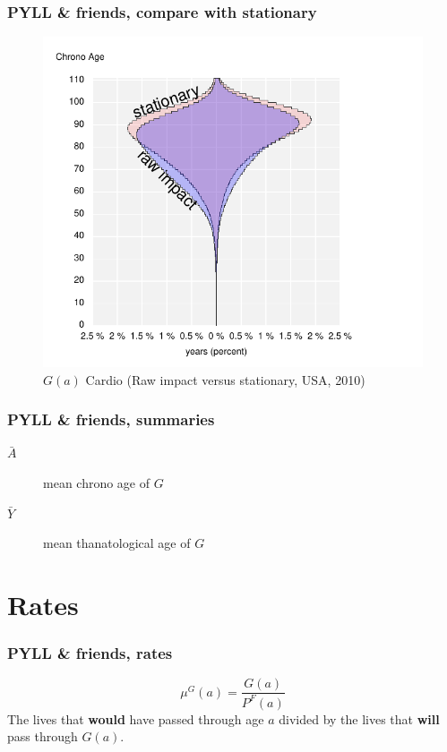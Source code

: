 \documentclass{beamer}
\begin{document}
\begin{frame}
\frametitle{PYLL \& friends, compare with stationary}
\vspace{-1cm}
\begin{figure}[b]
    \centering
    \includegraphics[scale=.7]{Figures/f13_AgesWonstationary.pdf}
    \caption{$G(a)$ Cardio (Raw impact versus stationary, USA, 2010)}
\end{figure} 
\end{frame}

\begin{frame}
\frametitle{PYLL \& friends, summaries}
\begin{description}
\item[$\bar{A}$] mean chrono age of $G$
\item[$\bar{Y}$] mean thanatological age of $G$
\end{description}
\end{frame}

\section{Rates}
\begin{frame}
\frametitle{PYLL \& friends, rates}
\begin{equation}
\mu^G(a) = \frac{G(a)}{P^F(a)}
\end{equation}
The lives that \textbf{would} have passed through age $a$ divided by the lives
that \textbf{will} pass through $G(a)$.
\end{frame}
\end{document}
